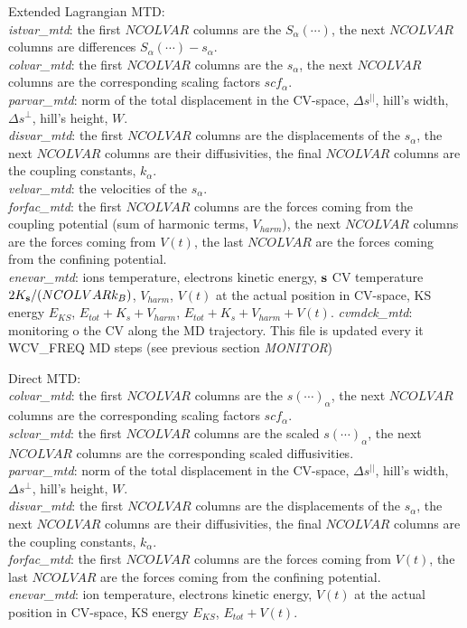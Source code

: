 \documentclass[twoside,10pt,titlepage,a4paper]{article}
\begin{document}
Extended Lagrangian MTD: \\
{\it istvar\_mtd}: the first $NCOLVAR$ columns are the $S_{\alpha}(\cdots)$,
the next $NCOLVAR$ columns are differences $S_{\alpha}(\cdots) - s_{\alpha}$. \\
{\it colvar\_mtd}: the first $NCOLVAR$ columns are the $s_{\alpha}$,
the next $NCOLVAR$ columns are the corresponding scaling factors
$scf_{\alpha}$. \\
{\it parvar\_mtd}: norm of the total displacement in the CV-space,
$\Delta s^{||}$, hill's width, $\Delta s^{\perp}$, hill's height, $W$. \\
{\it disvar\_mtd}: the first $NCOLVAR$ columns are the displacements
of the $s_{\alpha}$, the next $NCOLVAR$ columns are their diffusivities,
the final $NCOLVAR$ columns are the coupling constants, $k_\alpha$. \\
{\it velvar\_mtd}: the velocities of the $s_{\alpha}$. \\
{\it forfac\_mtd}: the first $NCOLVAR$ columns are the forces
coming from the coupling potential (sum of harmonic terms, $V_{harm}$),
the next $NCOLVAR$ columns are the forces coming from $V(t)$,
the last $NCOLVAR$  are the forces coming from the confining potential. \\
{\it enevar\_mtd}: ions temperature, electrons kinetic energy,
${\bf s}$ CV temperature $2 K_{\bf s}/(NCOLVAR k_{B})$,  $V_{harm}$,
$V(t)$ at the actual position in CV-space, KS energy
$E_{KS}$, $E_{tot}+ K_{s} + V_{harm}$, $E_{tot}+ K_{s} + V_{harm} + V(t)$.
{\it cvmdck\_mtd}:  monitoring o the CV along the MD trajectory. This file
is updated every {it WCV\_FREQ} MD steps (see previous section {\it MONITOR})

Direct MTD: \\
{\it colvar\_mtd}: the first $NCOLVAR$ columns are the $s(\cdots)_{\alpha}$,
the next $NCOLVAR$ columns are the corresponding scaling factors
$scf_{\alpha}$. \\
{\it sclvar\_mtd}: the first $NCOLVAR$ columns are the scaled
$s(\cdots)_{\alpha}$, the next $NCOLVAR$ columns are the corresponding
scaled diffusivities. \\
{\it parvar\_mtd}: norm of the total displacement in the CV-space,
$\Delta s^{||}$, hill's width, $\Delta s^{\perp}$, hill's height, $W$. \\
{\it disvar\_mtd}: the first $NCOLVAR$ columns are the displacements of
the $s_{\alpha}$, the next $NCOLVAR$ columns are their diffusivities,
the final $NCOLVAR$ columns are the coupling constants, $k_\alpha$. \\
{\it forfac\_mtd}: the first $NCOLVAR$ columns are the forces coming
from $V(t)$, the last $NCOLVAR$  are the forces coming from the
confining potential. \\
{\it enevar\_mtd}: ion temperature, electrons kinetic energy,
$V(t)$ at the actual position in CV-space, KS energy $E_{KS}$, $E_{tot}+ V(t)$.
\end{document}
